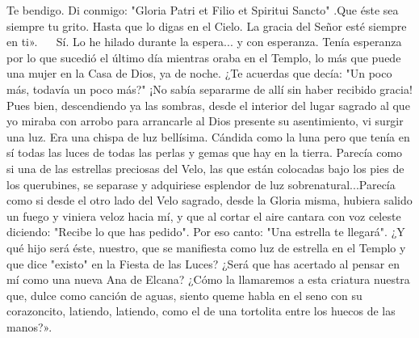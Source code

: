 \documentclass[12pt]{book} %
\begin{document}
Te bendigo. Di conmigo: "Gloria Patri et Filio et Spiritui Sancto" .Que éste sea siempre tu grito. Hasta que lo digas en el Cielo. La gracia del Señor esté siempre en ti». 
  
Sí. Lo he hilado durante la espera... y con esperanza. Tenía esperanza por lo que sucedió el último día mientras oraba en el Templo, lo más que puede una mujer en la Casa de Dios, ya de noche. ¿Te acuerdas que decía: "Un poco más, todavía un poco más?" ¡No sabía separarme de allí sin haber recibido gracia! Pues bien, descendiendo ya las sombras, desde el interior del lugar sagrado al que yo miraba con arrobo para arrancarle al Dios presente su asentimiento, vi surgir una luz. Era una chispa de luz bellísima. Cándida como la luna pero que tenía en sí todas las luces de todas las perlas y gemas que hay en la tierra. Parecía como si una de las estrellas preciosas del Velo, las que están colocadas bajo los pies de los querubines, se separase y adquiriese esplendor de luz sobrenatural...Parecía como si desde el otro lado del Velo sagrado, desde la Gloria misma, hubiera salido un fuego y viniera veloz hacia mí, y que al cortar el aire cantara con voz celeste diciendo: "Recibe lo que has pedido". Por eso canto: "Una estrella te llegará". ¿Y qué hijo será éste, nuestro, que se manifiesta como luz de estrella en el Templo y que dice "existo" en la Fiesta de las Luces? ¿Será que has acertado al pensar en mí como una nueva Ana de Elcana? ¿Cómo la llamaremos a esta 
criatura nuestra que, dulce como canción de aguas, siento queme habla en el seno con su corazoncito, latiendo, latiendo, como 
el de una tortolita entre los huecos de las manos?». 
\end{document}
